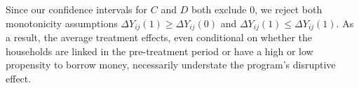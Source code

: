 \documentclass[12pt]{article}
\theoremstyle{definition}
\begin{document}
Since our confidence intervals for $C$ and $D$ both exclude $0$, we reject both monotonicity assumptions $\Delta Y_{ij}(1) \geq \Delta Y_{ij}(0)$ and $\Delta Y_{ij}(1) \leq \Delta Y_{ij}(1)$. As a result, the average treatment effects, even conditional on whether the households are linked in the pre-treatment period or have a high or low propensity to borrow money, necessarily understate the program's disruptive effect. 


%
\end{document}
